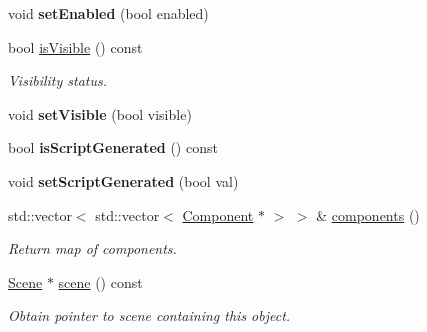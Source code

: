 \begin{Indent}
\begin{DoxyCompactItemize}
void {\bfseries set\+Enabled} (bool enabled)
\item 
\mbox{\label{classrev_1_1_scene_object_a9c521cc8b5cd949490a0677828682871}} 
bool \mbox{\hyperlink{classrev_1_1_scene_object_a9c521cc8b5cd949490a0677828682871}{is\+Visible}} () const
\begin{DoxyCompactList}\small\item\em Visibility status. \end{DoxyCompactList}\item 
\mbox{\label{classrev_1_1_scene_object_aef1a5603660a66d5613171fa57383053}} 
void {\bfseries set\+Visible} (bool visible)
\item 
\mbox{\label{classrev_1_1_scene_object_a7d16232a37c1fabe7f98e3349083a9ad}} 
bool {\bfseries is\+Script\+Generated} () const
\item 
\mbox{\label{classrev_1_1_scene_object_ab236fd38a7b2620cfa9292f16655502c}} 
void {\bfseries set\+Script\+Generated} (bool val)
\item 
\mbox{\label{classrev_1_1_scene_object_ad6d414b9c465324977147cb9026cd9d3}} 
std\+::vector$<$ std\+::vector$<$ \mbox{\hyperlink{classrev_1_1_component}{Component}} $\ast$ $>$ $>$ \& \mbox{\hyperlink{classrev_1_1_scene_object_ad6d414b9c465324977147cb9026cd9d3}{components}} ()
\begin{DoxyCompactList}\small\item\em Return map of components. \end{DoxyCompactList}\item 
\mbox{\label{classrev_1_1_scene_object_a099329842e285a99dbe08fd9b1d78004}} 
\mbox{\hyperlink{classrev_1_1_scene}{Scene}} $\ast$ \mbox{\hyperlink{classrev_1_1_scene_object_a099329842e285a99dbe08fd9b1d78004}{scene}} () const
\begin{DoxyCompactList}\small\item\em Obtain pointer to scene containing this object. \end{DoxyCompactList}\item 
\mbox{\label{classrev_1_1_scene_object_a0c186fa976cc07de0d4098bb3fbc0d1f}} 

\end{DoxyCompactItemize}
\end{Indent}
